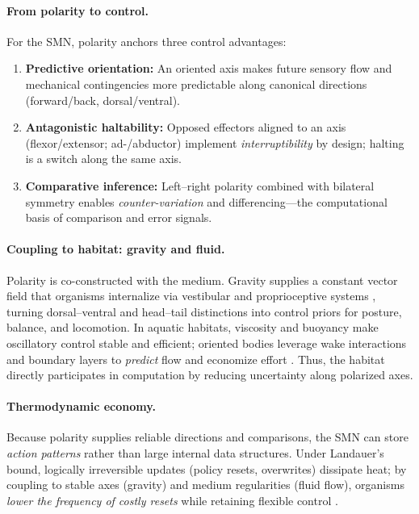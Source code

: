 \paragraph{From polarity to control.}
For the SMN, polarity anchors three control advantages:
\begin{enumerate}
    \item \textbf{Predictive orientation:} An oriented axis makes future sensory flow and mechanical contingencies more predictable along canonical directions (forward/back, dorsal/ventral).
    \item \textbf{Antagonistic haltability:} Opposed effectors aligned to an axis (flexor/extensor; ad-/abductor) implement \emph{interruptibility} by design; halting is a switch along the same axis.
    \item \textbf{Comparative inference:} Left--right polarity combined with bilateral symmetry enables \emph{counter-variation} and differencing---the computational basis of comparison and error signals.
\end{enumerate}

\paragraph{Coupling to habitat: gravity and fluid.}
Polarity is co-constructed with the medium.
Gravity supplies a constant vector field that organisms internalize via vestibular and proprioceptive systems \cite{AngelakiCullen2008VestibularMultisensory}, turning dorsal--ventral and head--tail distinctions into control priors for posture, balance, and locomotion.
In aquatic habitats, viscosity and buoyancy make oscillatory control stable and efficient; oriented bodies leverage wake interactions and boundary layers to \emph{predict} flow and economize effort \cite{Vogel1994LifeInMovingFluids,Alexander2003PrinciplesLocomotion}.
Thus, the habitat directly participates in computation by reducing uncertainty along polarized axes.

\paragraph{Thermodynamic economy.}
Because polarity supplies reliable directions and comparisons, the SMN can store \emph{action patterns} rather than large internal data structures.
Under Landauer's bound, logically irreversible updates (policy resets, overwrites) dissipate heat; by coupling to stable axes (gravity) and medium regularities (fluid flow), organisms \emph{lower the frequency of costly resets} while retaining flexible control \cite{Landauer1961Irreversibility,Bennett2003LandauerNotes,StillEtAl2012ThermoPrediction}.

